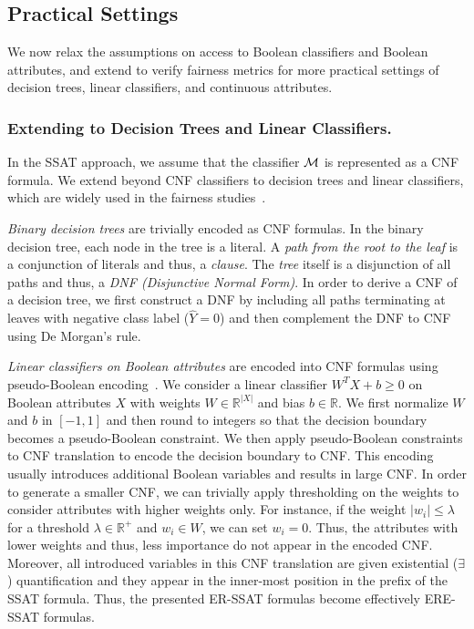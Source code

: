\subsection{Practical Settings}
\label{sec:practical-setting}
We now relax the assumptions on access to Boolean classifiers and Boolean attributes, and extend {\justicia} to verify fairness metrics for more practical settings of decision trees, linear classifiers, and continuous attributes.

\subsubsection{Extending to Decision Trees and Linear Classifiers. }
In the SSAT approach, we assume that the classifier $\mathcal{M}$ is represented as a CNF formula.  
We extend {\justicia} beyond CNF classifiers to decision trees and linear classifiers, which are widely used in the fairness studies~\cite{zemel2013learning,raff2018fair,zhang2019faht}.

\textit{Binary decision trees} are trivially encoded as  CNF formulas.  In the binary decision tree, each node in the tree is a literal. A \textit{path from the root to the leaf} is a conjunction of literals and thus, a \textit{clause}. The \textit{tree} itself is a disjunction of all paths and thus, a \textit{DNF (Disjunctive Normal Form)}. In order to derive a CNF of a decision tree, we first construct a DNF by including all paths terminating at leaves with negative class label ($ \hat{Y} = 0 $) and then complement the DNF to CNF using De Morgan's rule. 

\textit{Linear classifiers on Boolean attributes} are encoded into CNF formulas using pseudo-Boolean encoding~\cite{philipp2015pblib}. We consider a linear classifier  $ W^T X + b \ge 0 $ on Boolean attributes $ X $ with weights $ W \in \mathbb{R}^{|X|} $ and bias $ b \in \mathbb{R} $.  We first normalize $W$ and $b $ in $ [-1,1] $ and then round to integers so that the decision boundary becomes a pseudo-Boolean constraint.  We then apply  pseudo-Boolean constraints to CNF translation to encode the decision boundary to CNF. This encoding usually introduces additional Boolean variables and results in large CNF. In order to generate a smaller CNF, we can trivially apply thresholding  on the weights to consider attributes with higher weights only. For instance, if the weight $  |w_i| \le \lambda $ for a threshold $ \lambda  \in \mathbb{R}^+$ and $ w_i \in W $, we can set $ w_i = 0 $. Thus, the attributes with lower weights and thus, less importance do not appear in the encoded CNF.  Moreover, all introduced variables in this CNF translation are given existential ($ \exists $) quantification and they appear in the inner-most position in the prefix of the SSAT formula. Thus, the presented ER-SSAT formulas become effectively ERE-SSAT formulas.

